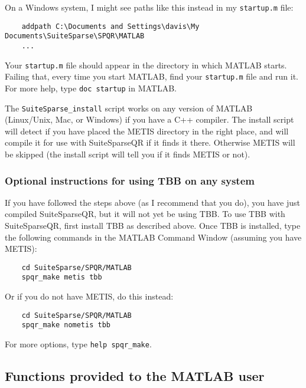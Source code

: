 \documentclass[12pt]{article}
\begin{document}
On a Windows system, I might see paths like this instead in my \verb'startup.m'
file:

{\footnotesize
\begin{verbatim}
    addpath C:\Documents and Settings\davis\My Documents\SuiteSparse\SPQR\MATLAB
    ...
\end{verbatim}
}

Your \verb'startup.m' file should appear in the directory in which MATLAB
starts.  Failing that, every time you start MATLAB, find your \verb'startup.m'
file and run it.  For more help, type \verb'doc startup' in MATLAB.

The \verb'SuiteSparse_install' script works on any version of MATLAB
(Linux/Unix, Mac, or Windows) if you have a C++ compiler.  The install script
will detect if you have placed the METIS directory in the right place, and will
compile it for use with SuiteSparseQR if it finds it there.  Otherwise METIS
will be skipped (the install script will tell you if it finds METIS or not).

\subsubsection{Optional instructions for using TBB on any system}

If you have followed the steps above (as I recommend that you do), you have
just compiled SuiteSparseQR, but it will not yet be using TBB.  To use TBB with
SuiteSparseQR, first install TBB as described above.  Once TBB is installed,
type the following commands in the MATLAB Command Window (assuming you have
METIS):

\begin{verbatim}
    cd SuiteSparse/SPQR/MATLAB
    spqr_make metis tbb
\end{verbatim}

Or if you do not have METIS, do this instead:

\begin{verbatim}
    cd SuiteSparse/SPQR/MATLAB
    spqr_make nometis tbb
\end{verbatim}

For more options, type \verb'help spqr_make'.

\subsection{Functions provided to the MATLAB user}
\end{document}
